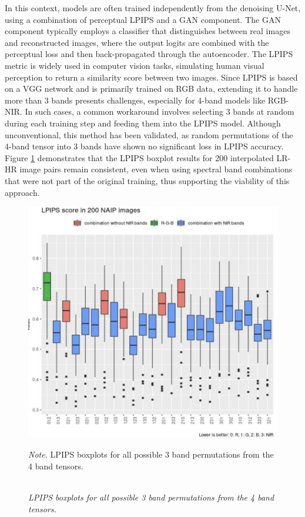 In this context, models are often trained independently from the denoising U-Net, using a combination of perceptual LPIPS and a GAN component. The GAN component typically employs a classifier that distinguishes between real images and reconstructed images, where the output logits are combined with the perceptual loss and then back-propagated through the autoencoder. The LPIPS metric \autocite{zhang2018unreasonable} is widely used in computer vision tasks, simulating human visual perception to return a similarity score between two images. Since LPIPS is based on a VGG network \autocite{simonyan2015deep} and is primarily trained on RGB data, extending it to handle more than 3 bands presents challenges, especially for 4-band models like RGB-NIR. In such cases, a common workaround involves selecting 3 bands at random during each training step and feeding them into the LPIPS model. Although unconventional, this method has been validated, as random permutations of the 4-band tensor into 3 bands have shown no significant loss in LPIPS accuracy. Figure \ref{fig:lpips_permutation} demonstrates that the LPIPS boxplot results for 200 interpolated LR-HR image pairs remain consistent, even when using spectral band combinations that were not part of the original training, thus supporting the viability of this approach.


\begin{figure}[H]
    \caption{\doublespacing \\ \textit{LPIPS boxplots for all possible 3 band permutations from the 4 band tensors.}} 
    \centering
    \includegraphics[width=1\linewidth]{images/lpips_permutation.png}
    \begin{justify}
        \textit{Note.} LPIPS boxplots for all possible 3 band permutations from the 4 band tensors.
    \end{justify}                    
    \label{fig:lpips_permutation}
\end{figure}


